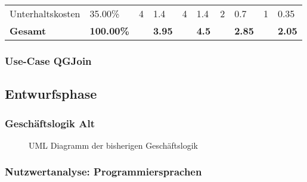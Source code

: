 \begin{table}[!htp]
\begin{tabular}{llllllllll}
		\rowcolor[HTML]{BBDAFF}
		Unterhaltskosten                          & 35.00\%                                 & 4                                                   & 1.4                                    & 4                                                   & 1.4                                    & 2                                                     & 0.7                                    & 1                                         & 0.35                                   \\
		\textbf{Gesamt}                           & \textbf{100.00\%}                       & \textbf{}                                           & \textbf{3.95}                          & \textbf{}                                           & \textbf{4.5}                           & \textbf{}                                             & \textbf{2.85}                          & \textbf{}                                 & \textbf{2.05}
	\end{tabular}
\end{table}

\subsubsection{Use-Case QGJoin}

\subsection{Entwurfsphase}
\subsubsection{Geschäftslogik Alt}
\begin{figure}
	\label{fig:geschäftslogikAlt}
	\caption{UML Diagramm der bisherigen Geschäftslogik}
\end{figure}
\subsubsection{Nutzwertanalyse: Programmiersprachen}

